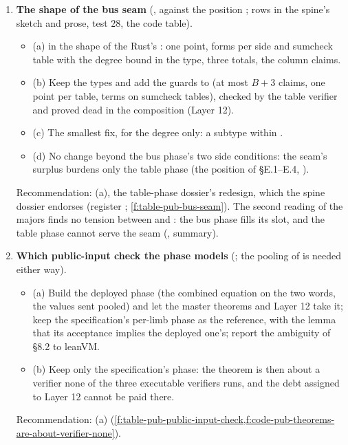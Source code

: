 \begin{enumerate}[leftmargin=*, itemsep=6pt]
\item \textbf{The shape of the bus seam} (, against the position ; rows in the
  spine's sketch and prose, test 28, the code table).
  \begin{itemize}[label={}, leftmargin=1.2em]
  \item (a)  in the shape of the Rust's : one point, forms per side and
    sumcheck table with the degree bound in the type, three totals, the column claims.
  \item (b) Keep the types and add the guards to  (at most $B + 3$ claims, one point
    per table, terms on sumcheck tables), checked by the table verifier and proved dead in the
    composition (Layer 12).
  \item (c) The smallest fix, for the degree only:  a subtype within
    .
  \item (d) No change beyond the bus phase's two side conditions: the seam's surplus burdens only
    the table phase (the position of  §E.1--E.4, ).
  \end{itemize}
  Recommendation: (a), the table-phase dossier's redesign, which the spine dossier endorses
  (register ; \cref{f:table-pub-bus-seam}). The second reading of the majors finds no
  tension between  and : the bus phase fills its slot, and the table phase cannot
  serve the seam (, summary).

\item \textbf{Which public-input check the phase models} (; the pooling of  is
  needed either way).
  \begin{itemize}[label={}, leftmargin=1.2em]
  \item (a) Build the deployed phase (the combined equation on the two words, the values sent
    pooled) and let the master theorems and Layer 12 take it; keep the specification's per-limb
    phase as the reference, with the lemma that its acceptance implies the deployed one's; report
    the ambiguity of §8.2 to leanVM.
  \item (b) Keep only the specification's phase: the theorem is then about a verifier none of the
    three executable verifiers runs, and the debt assigned to Layer 12 cannot be paid there.
  \end{itemize}
  Recommendation: (a) (\cref{f:table-pub-public-input-check,f:code-pub-theorems-are-about-verifier-none}).


\end{enumerate}
